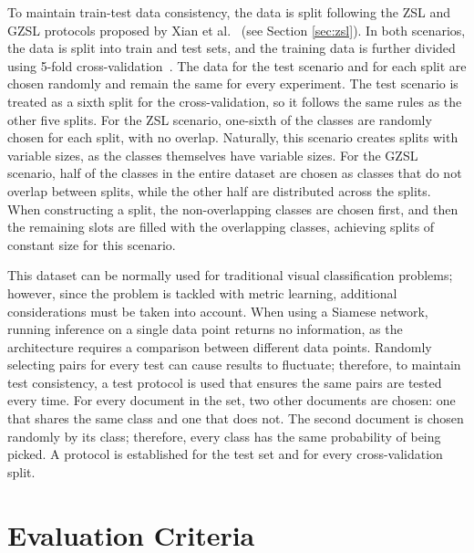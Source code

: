 To maintain train-test data consistency, the data is split following the \gls{ZSL} and \gls{GZSL} protocols proposed by Xian et al.~\cite{xian_zero-shot_2019} (see Section \ref{sec:zsl}). In both scenarios, the data is split into train and test sets, and the training data is further divided using 5-fold cross-validation~\cite{wong_reliable_2019}. The data for the test scenario and for each split are chosen randomly and remain the same for every experiment. The test scenario is treated as a sixth split for the cross-validation, so it follows the same rules as the other five splits. For the \gls{ZSL} scenario, one-sixth of the classes are randomly chosen for each split, with no overlap. Naturally, this scenario creates splits with variable sizes, as the classes themselves have variable sizes. For the \gls{GZSL} scenario, half of the classes in the entire dataset are chosen as classes that do not overlap between splits, while the other half are distributed across the splits. When constructing a split, the non-overlapping classes are chosen first, and then the remaining slots are filled with the overlapping classes, achieving splits of constant size for this scenario.

This dataset can be normally used for traditional visual classification problems; however, since the problem is tackled with metric learning, additional considerations must be taken into account. When using a Siamese network, running inference on a single data point returns no information, as the architecture requires a comparison between different data points. Randomly selecting pairs for every test can cause results to fluctuate; therefore, to maintain test consistency, a test protocol is used that ensures the same pairs are tested every time. For every document in the set, two other documents are chosen: one that shares the same class and one that does not. The second document is chosen randomly by its class; therefore, every class has the same probability of being picked. A protocol is established for the test set and for every cross-validation split.


\section{Evaluation Criteria}
\label{sec:evaluation}

